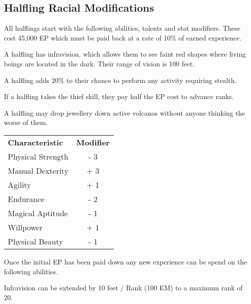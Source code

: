 \documentclass[a4paper]{article}
\begin{document}
\begin{multicols*}{3}


\section{Halfling Racial Modifications}

All halflings start with the following abilities, talents and stat
modifiers.  These cost 45,000 EP which must be paid back at a
rate of 10\% of earned experience.
  
\begin{Enumerate}
\item
A halfling has infravision, which allows them to see faint red shapes
where living beings are located in the dark. Their range of vision is
100 feet.

\item
A halfling adds 20\% to their chance to perform any activity requiring
stealth.

\item
If a halfling takes the thief skill, they pay half the EP cost to
advance ranks.

\item
A halfling may drop jewellery down active volcanos without anyone
thinking the worse of them.
\end{Enumerate}

\begin{tabularx}{\linewidth}{Xc}
\textbf{Characteristic} & \textbf{Modifier} \\
Physical Strength	& - 3 \\
Manual Dexterity	& + 3 \\
Agility			& + 1 \\
Endurance		& - 2 \\
Magical Aptitude	& - 1 \\
Willpower		& + 1 \\
Physical Beauty		& - 1 \\
\end{tabularx}

Once the initial EP has been paid down any new experience can be spend
on the following abilities.

\begin{Enumerate}
\item
Infravision can be extended by 10 feet / Rank (100 EM) to a maximum rank of 20.


\end{Enumerate}
\end{multicols*}
\end{document}
